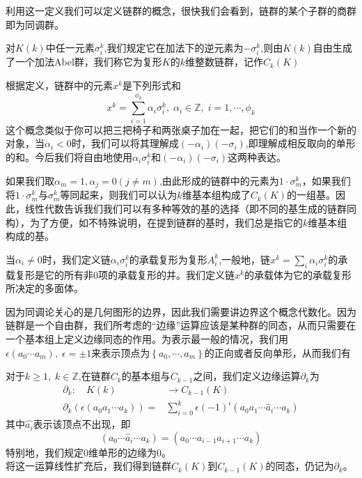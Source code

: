 利用这一定义我们可以定义链群的概念，很快我们会看到，链群的某个子群的商群即为同调群。
\begin{definition}
对$K(k)$中任一元素$\sigma^{k}_{i}$,我们规定它在加法下的逆元素为$-\sigma^{k}_{i}$,则由$K(k)$自由生成了一个加法Abel群，我们称它为复形$K$的$k$维整数链群，记作$C_{k}(K)$
\end{definition}
\begin{remark}
    根据定义，链群中的元素$x^{k}$是下列形式和
    \begin{equation*}
        x^{k}=\sum\limits_{i=1}^{\phi_{k}}\alpha_{i}\sigma_{i}^{k},\;\alpha_{i}\in \mathbb{Z},\;i=1,\cdots,\phi_{k}
    \end{equation*}
    这个概念类似于你可以把三把椅子和两张桌子加在一起，把它们的和当作一个新的对象，当$\alpha_{i}<0$时，我们可以将其理解成$(-\alpha_{i})(-\sigma_{i})$,即理解成相反取向的单形的和。今后我们将自由地使用$\alpha_{i}\sigma^{k}_{i}$和$(-\alpha_{i})(-\sigma_{i})$这两种表达。
\end{remark}
\begin{remark}
    如果我们取$\alpha_{m}=1,\alpha_{j}=0(j\neq m)$,由此形成的链群中的元素为$1\cdot\sigma^{k}_{m}$，如果我们将$1\cdot\sigma^{k}_{m}$与$\sigma^{k}_{m}$等同起来，则我们可以认为$k$维基本组构成了$C_{k}(K)$的一组基。因此，线性代数告诉我们我们可以有多种等效的基的选择（即不同的基生成的链群同构），为了方便，如不特殊说明，在提到链群的基时，我们总是指它的$k$维基本组构成的基。
\end{remark}
\begin{definition}
当$\alpha_{i}\neq 0$时，我们定义链$\alpha_{i}\sigma_{i}^{k}$的承载复形为复形$A^{k}_{i}$,一般地，链$x^{k}=\sum\limits_{i}\alpha_{i}\sigma_{i}^{k}$的承载复形是它的所有非0项的承载复形的并。我们定义链$x^{k}$的承载体为它的承载复形所决定的多面体。
\end{definition}
因为同调论关心的是几何图形的边界，因此我们需要讲边界这个概念代数化。因为链群是一个自由群，我们所考虑的“边缘”运算应该是某种群的同态，从而只需要在一个基本组上定义边缘同态的作用。为表示最一般的情况，我们用$\epsilon(a_{0}\cdots a_{m}),\;\epsilon=\pm1$来表示顶点为$\left\{a_{0},\cdots,a_{m}\right\}$的正向或者反向单形，从而我们有
\begin{definition}
对于$k\geq1,\;k\in\mathbb{Z}$,在链群$C_{k}$的基本组与$C_{k-1}$之间，我们定义边缘运算$\partial_{k}$为
\begin{equation*}
\begin{aligned}
    \partial_{k}:\quad K(k)&\longrightarrow C_{k-1}(K)\\
    \partial_{k}(\epsilon(a_{0}a_{1}\cdots a_{k}))=&\sum\limits_{i=0}^{k}\epsilon(-1)^{i}(a_{0}a_{1}\cdots\hat{a}_{i}\cdots a_{k})
    \end{aligned}
\end{equation*}
其中$\hat{a_{i}}$表示该顶点不出现，即
\begin{equation*}
    (a_{0}\cdots\hat{a}_{i}\cdots a_{k})=(a_{0}\cdots{a}_{i-1}a_{i+1}\cdots a_{k})
\end{equation*}
特别地，我们规定0维单形的边缘为0。\\
将这一运算线性扩充后，我们得到链群$C_{k}(K)$到$C_{k-1}(K)$的同态，仍记为$\partial_{k}$。
\end{definition}
